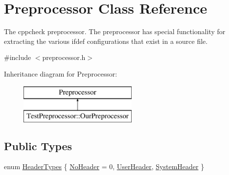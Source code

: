 \hypertarget{class_preprocessor}{\section{Preprocessor Class Reference}
\label{class_preprocessor}
}


The cppcheck preprocessor. The preprocessor has special functionality for extracting the various ifdef configurations that exist in a source file.  




{\ttfamily \#include $<$preprocessor.\-h$>$}

Inheritance diagram for Preprocessor\-:\begin{figure}[H]
\begin{center}
\leavevmode
\includegraphics[height=2.000000cm]{class_preprocessor}
\end{center}
\end{figure}
\subsection*{Public Types}
\begin{DoxyCompactItemize}
\item 
enum \hyperlink{class_preprocessor_a520e91d9d06d928a7377385fe9414d11}{Header\-Types} \{ \hyperlink{class_preprocessor_a520e91d9d06d928a7377385fe9414d11af2a2f2c7dbbeb10e551d2d1e25703d8f}{No\-Header} = 0, 
\hyperlink{class_preprocessor_a520e91d9d06d928a7377385fe9414d11a0850c8e9679edca7e73394145eb2d385}{User\-Header}, 
\hyperlink{class_preprocessor_a520e91d9d06d928a7377385fe9414d11a58fcecd44de65f644c7e9399b5461471}{System\-Header}
 \}
\end{DoxyCompactItemize}
